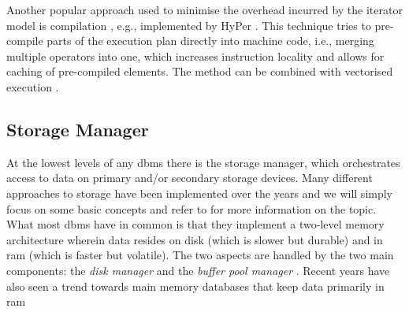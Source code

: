 Another popular approach used to minimise the overhead incurred by the iterator model is compilation \cite{Krolik:2021r3d3,Funke:2021Low}, e.g., implemented by HyPer \cite{Neumann:2011Efficiently,Neumann:2014Compiling,Blacher:2022Machine}. This technique tries to pre-compile parts of the execution plan directly into machine code, i.e., merging multiple operators into one, which increases instruction locality and allows for caching of pre-compiled elements. The method can be combined with vectorised execution \cite{Sompolski:2011Vectorization,Rosenfeld:2022Query}.

\subsection{Storage Manager}
\label{section:databases_storage_manager}
At the lowest levels of any \acrshort{dbms} there is the storage manager, which orchestrates access to data on primary and/or secondary storage devices. Many different approaches to storage have been implemented over the years and we will simply focus on some basic concepts and refer to \cite{Petrov:2019Database} for more information on the topic. What most \acrshort{dbms} have in common is that they implement a two-level memory architecture wherein data resides on disk (which is slower but durable) and in \acrfull{ram} (which is faster but volatile). The two aspects are handled by the two main components: the \emph{disk manager} and the \emph{buffer pool manager} \cite{Petrov:2019Database}. Recent years have also seen a trend towards main memory databases that keep data primarily in \acrshort{ram} \cite{Garcia:1992Main,Faerber:2017Main}

